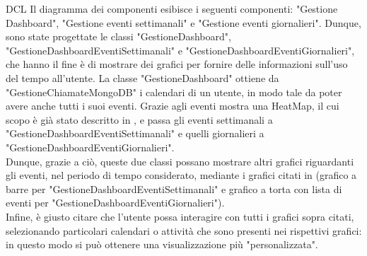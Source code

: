 \begin{listaPersonale}{DCL}
    Il diagramma dei componenti esibisce i seguenti componenti: "Gestione Dashboard", "Gestione eventi settimanali" e "Gestione eventi giornalieri". Dunque, sono state progettate le classi "GestioneDashboard", "GestioneDashboardEventiSettimanali" e "GestioneDashboardEventiGiornalieri", che hanno il fine è di mostrare dei grafici per fornire delle informazioni sull'uso del tempo all'utente.
    La classe "GestioneDashboard" ottiene da "GestioneChiamateMongoDB" i calendari di un utente, in modo tale da poter avere anche tutti i suoi eventi. Grazie agli eventi mostra una HeatMap, il cui scopo è già stato descritto in , e passa gli eventi settimanali a "GestioneDashboardEventiSettimanali" e quelli giornalieri a "GestioneDashboardEventiGiornalieri". \\
    Dunque, grazie a ciò, queste due classi possano mostrare altri grafici riguardanti gli eventi, nel periodo di tempo considerato, mediante i grafici citati in  (grafico a barre per "GestioneDashboardEventiSettimanali" e grafico a torta con lista di eventi per "GestioneDashboardEventiGiornalieri").\\
    Infine, è giusto citare che l'utente possa interagire con tutti i grafici sopra citati, selezionando particolari calendari o attività che sono presenti nei rispettivi grafici: in questo modo si può ottenere una visualizzazione più "personalizzata".


    \begin{center}
        
    \end{center}

    \newpage



\end{listaPersonale}
